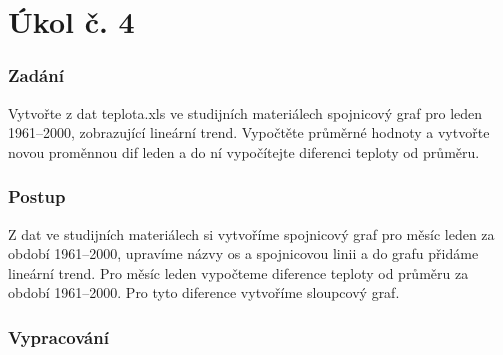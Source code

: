 \documentclass{article}
\begin{document}
\newpage
	\maketitle %
	 	
	 	
	 \part*{Úkol č. 4}
	 \section*{Zadání} %
	 	
	 	Vytvořte z dat teplota.xls ve studijních materiálech spojnicový graf pro leden 1961--2000, zobrazující lineární trend. Vypočtěte průměrné hodnoty a vytvořte novou proměnnou dif leden a do ní vypočítejte diferenci teploty od průměru. 
	 	
 	 	
	 		
	 	\section*{Postup} %
	 	
	 			
		Z dat ve studijních materiálech si vytvoříme spojnicový graf pro měsíc leden za období 1961--2000, upravíme  názvy os a spojnicovou linii a do grafu přidáme lineární trend. Pro měsíc leden vypočteme diference teploty od průměru za období 1961--2000. Pro tyto diference vytvoříme sloupcový graf.
		
		\section*{Vypracování}
\end{document}
